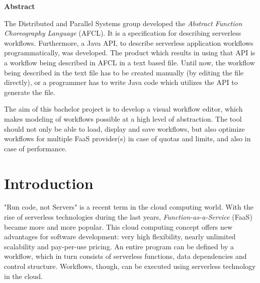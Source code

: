 \documentclass[a4paper,top=25mm,bottom=25mm,12pt,pdftex,halfparskip,twoside,bibtotoc,numbers=noenddot]{scrbook}
\begin{document}


\clearpage



\clearpage

\thispagestyle{plain}

\vspace{2.5cm}
\begin{center}
\textbf{Abstract}
\end{center}


The Distributed and Parallel Systems group developed the \emph{Abstract Function Choreography Language} (AFCL). It is a specification for describing serverless workflows. Furthermore, a Java API, to describe serverless application workflows programmatically, was developed.
The product which results in using that API is a workflow being described in AFCL in a text based file.
Until now, the workflow being described in the text file has to be created manually (by editing the file directly), or a programmer has to write Java code which utilizes the API to generate the file.
\par
The aim of this bachelor project is to develop a visual workflow editor, which makes modeling of workflows possible at a high level of abstraction. The tool should not only be able to load, display and save workflows, but also optimize workflows for multiple FaaS provider(s) in case of quotas and limits, and also in case of performance.

\tableofcontents

\listoffigures

\listoftables

\mainmatter
\pagestyle{fancy}

\renewcommand{\chaptermark}[1]{%
	\markboth{\thechapter.\ #1}{}
}

\fancyhead{}
\fancyhead[LO]{\leftmark}
\fancyhead[RE]{\rightmark}
\fancyfoot{}
\fancyfoot[LO,RE]{\thepage}

\label{chap:introduction}
\chapter{Introduction}



"Run code, not Servers" is a recent term in the cloud computing world.
With the rise of serverless technologies during the last years, \emph{Function-as-a-Service} (FaaS) became more and more popular. This cloud computing concept offers new advantages for software development: very high flexibility, nearly unlimited scalability and pay-per-use pricing. An entire program can be defined by a workflow, which in turn consists of serverless functions, data dependencies and control structure. Workflows, though, can be executed using serverless technology in the cloud.
\end{document}
